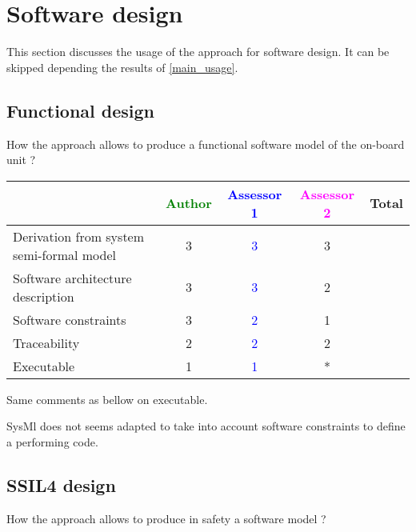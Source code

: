 \section{Software design}
This section discusses the usage of the approach for software design.
It can be skipped depending the results of \ref{main_usage}.

\subsection{Functional design}

How the approach allows to produce a functional software model of the on-board unit ?

\begin{tabular}{|l | c | c | c | c|}
\hline
& \textcolor{green}{Author} & \textcolor{blue}{Assessor 1} & \textcolor{magenta}{Assessor 2} & Total \\
\hline
Derivation from system semi-formal model & 3 & \textcolor{blue}{3} & 3 & \\
\hline
Software architecture description & 3 & \textcolor{blue}{3} & 2 & \\
\hline
Software constraints & 3 & \textcolor{blue}{2} & 1 & \\
\hline
Traceability & 2 & \textcolor{blue}{2} & 2 & \\
\hline
Executable & 1 & \textcolor{blue}{1} & * & \\
\hline
\end{tabular}



\begin{assessor2}
Same comments as bellow on executable.

SysMl does not seems adapted to take into account software constraints to define a performing code.
\end{assessor2}

\subsection{SSIL4 design}

How the approach allows to produce in safety a software model ?

